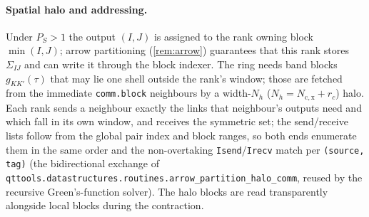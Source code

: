 \paragraph{Spatial halo and addressing.} Under $P_S>1$ the output
$(I,J)$ is assigned to the rank owning block $\min(I,J)$; arrow
partitioning (\cref{rem:arrow}) guarantees that this rank stores
$\Sigma_{IJ}$ and can write it through the block indexer. The
ring needs band blocks $g_{KK'}(\tau)$ that may lie one shell
outside the rank's window; those are fetched from the immediate
\texttt{comm.block} neighbours by a width-$N_h$ ($N_h=N_\mathrm{c,x}+r_c$)
halo. Each rank sends a neighbour exactly the links that
neighbour's outputs need and which fall in its own window, and
receives the symmetric set; the send/receive lists follow from the
global pair index and block ranges, so both ends enumerate them in
the same order and the non-overtaking \texttt{Isend}/\texttt{Irecv}
match per \texttt{(source, tag)} (the bidirectional exchange of
\texttt{qttools.datastructures.routines.arrow\_partition\_halo\_comm},
reused by the recursive Green's-function solver). The halo blocks
are read transparently alongside local blocks during the
contraction.

